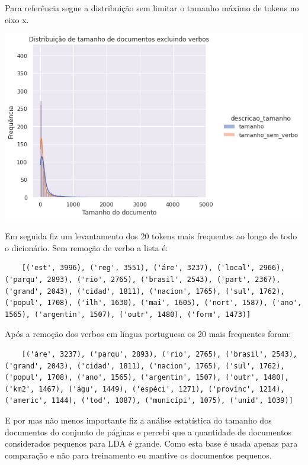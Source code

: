 Para referência segue a distribuição sem limitar o tamanho máximo de tokens no eixo x.

\vspace{3mm} %

\includegraphics[scale=0.75]{explore/resources/wp_comparacao_distribuicao_tamanhos_kde.png}

\vspace{3mm} %

Em seguida fiz um levantamento dos 20 tokens mais frequentes ao longo de todo o dicionário. Sem remoção de verbo a lista é:

\begin{lstlisting}
    [('est', 3996), ('reg', 3551), ('áre', 3237), ('local', 2966), ('parqu', 2893), ('rio', 2765), ('brasil', 2543), ('part', 2367), ('grand', 2043), ('cidad', 1811), ('nacion', 1765), ('sul', 1762), ('popul', 1708), ('ilh', 1630), ('mai', 1605), ('nort', 1587), ('ano', 1565), ('argentin', 1507), ('outr', 1480), ('form', 1473)]
\end{lstlisting}

Após a remoção dos verbos em língua portuguesa os 20 mais frequentes foram:

\begin{lstlisting}
    [('áre', 3237), ('parqu', 2893), ('rio', 2765), ('brasil', 2543), ('grand', 2043), ('cidad', 1811), ('nacion', 1765), ('sul', 1762), ('popul', 1708), ('ano', 1565), ('argentin', 1507), ('outr', 1480), ('km2', 1467), ('águ', 1449), ('espéci', 1271), ('provínc', 1214), ('americ', 1144), ('tod', 1087), ('municípi', 1075), ('unid', 1039)]    
\end{lstlisting}

E por mas não menos importante fiz a análise estatística do tamanho dos documentos do conjunto de páginas e percebi que a quantidade de documentos
considerados pequenos para LDA é grande. Como esta base é usada apenas para comparação e não para treinamento eu mantive os documentos pequenos.

